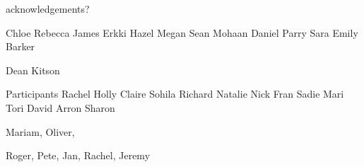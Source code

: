 
\begin{dedication} 
acknowledgements?

Chloe
Rebecca
James
Erkki
Hazel
Megan
Sean
Mohaan
Daniel Parry
Sara
Emily Barker


Dean
Kitson

Participants
Rachel
Holly
Claire
Sohila
Richard
Natalie
Nick
Fran
Sadie
Mari
Tori
David
Arron
Sharon

Mariam, Oliver, 

Roger, Pete, Jan, Rachel, Jeremy

\end{dedication}

